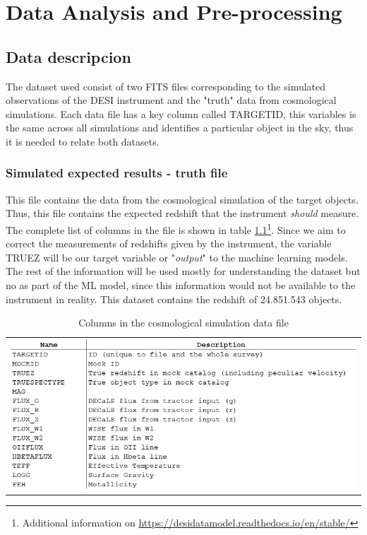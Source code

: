\chapter{Data Analysis and Pre-processing}
\label{Ch:Data}
\section{Data descripcion}

The dataset used consist of two FITS files corresponding to the simulated observations of the DESI instrument and the "truth" data from cosmological simulations. Each data file has a key column called TARGETID, this variables is the same across all simulations and identifies a particular object in the sky, thus it is needed to relate both datasets. 
\subsection{Simulated expected results - truth file}
This file contains the data from the cosmological simulation of the target objects. Thus, this file contains the expected redshift that the instrument \textit{should} measure. The complete list of columns in the file is shown in table \ref{tab:true_car}\footnote{Additional information on \url{https://desidatamodel.readthedocs.io/en/stable/}}. Since we aim to correct the measurements of redshifts given by the instrument, the variable TRUEZ will be our target variable or "\textit{output}" to the machine learning models. The rest of the information will be used mostly for understanding the dataset but no as part of the ML model, since this information would not be available to the instrument in reality. This dataset contains the redshift of 24.851.543 objects. 
\begin{table}[!htbp]
	\centering
	\begin{tabular}{c}
		\includegraphics[width=0.9\linewidth]{TeX_files/Imagenes/Imagen2}
	\end{tabular} 
	\caption{Columns in the cosmological simulation data file}
	\label{tab:true_car}
\end{table}

